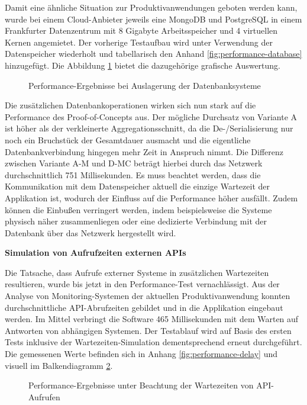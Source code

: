 Damit eine ähnliche Situation zur Produktivanwendungen geboten werden kann, wurde bei einem Cloud-Anbieter jeweils eine MongoDB und PostgreSQL in einem Frankfurter Datenzentrum mit 8 Gigabyte Arbeitsspeicher und 4 virtuellen Kernen angemietet. Der vorherige Testaufbau wird unter Verwendung der Datenspeicher wiederholt und tabellarisch den Anhand \ref{fig:performance-database} hinzugefügt. Die Abbildung \ref{fig:PerformanceDatabase} bietet die dazugehörige grafische Auswertung.

\begin{figure}[htpb]
	\centering
	\footnotesize
	
	\caption{Performance-Ergebnisse bei Auslagerung der Datenbanksysteme}
	\label{fig:PerformanceDatabase}
\end{figure}

Die zusätzlichen Datenbankoperationen wirken sich nun stark auf die Performance des Proof-of-Concepts aus. Der mögliche Durchsatz von Variante A ist höher als der verkleinerte Aggregationsschnitt, da die De-/Serialisierung nur noch ein Bruchstück der Gesamtdauer ausmacht und die eigentliche Datenbankverbindung hingegen mehr Zeit in Anspruch nimmt. Die Differenz zwischen Variante A-M und D-MC beträgt hierbei durch das Netzwerk durchschnittlich 751 Millisekunden. Es muss beachtet werden, dass die Kommunikation mit dem Datenspeicher aktuell die einzige Wartezeit der Applikation ist, wodurch der Einfluss auf die Performance höher ausfällt. Zudem können die Einbußen verringert werden, indem beispielsweise die Systeme physisch näher zusammenliegen oder eine dedizierte Verbindung mit der Datenbank über das Netzwerk hergestellt wird.


\textbf{Simulation von Aufrufzeiten externen APIs}

Die Tatsache, dass Aufrufe externer Systeme in zusätzlichen Wartezeiten resultieren, wurde bis jetzt in den Performance-Test vernachlässigt. Aus der Analyse von Monitoring-Systemen der aktuellen Produktivanwendung konnten durchschnittliche API-Abrufzeiten gebildet und in die Applikation eingebaut werden. Im Mittel verbringt die Software 465 Millisekunden mit dem Warten auf Antworten von abhängigen Systemen. Der Testablauf wird auf Basis des ersten Tests inklusive der Wartezeiten-Simulation dementsprechend erneut durchgeführt. Die gemessenen Werte befinden sich in Anhang \ref{fig:performance-delay} und visuell im Balkendiagramm \ref{fig:PerformanceDelay}. 

\begin{figure}[htpb]
	\centering
	\footnotesize
	
	\caption{Performance-Ergebnisse unter Beachtung der Wartezeiten von API-Aufrufen}
	\label{fig:PerformanceDelay}
\end{figure}

